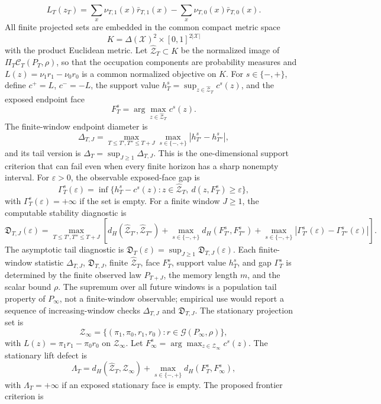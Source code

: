 \documentclass[11pt]{article}
\theoremstyle{definition}
\theoremstyle{plain}
\theoremstyle{remark}
\begin{document}
\[
L_T(z_T)=\sum_x\nu_{T,1}(x)\bar r_{T,1}(x)-\sum_x\nu_{T,0}(x)\bar r_{T,0}(x).
\]
All finite projected sets are embedded in the common compact metric space
\[
K=\Delta(\mathcal X)^2\times[0,1]^{2|\mathcal X|}
\]
with the product Euclidean metric.  Let \(\widehat{\mathcal Z}_T\subset K\) be the normalized image of \(\Pi_T\mathcal C_T(P_T,\rho)\), so that the occupation components are probability measures and \(L(z)=\nu_1r_1-\nu_0r_0\) is a common normalized objective on \(K\).  For \(s\in\{-,+\}\), define \(c^+=L\), \(c^-=-L\), the support value \(h_T^s=\sup_{z\in\widehat{\mathcal Z}_T}c^s(z)\), and the exposed endpoint face
\[
F_T^s=\arg\max_{z\in\widehat{\mathcal Z}_T}c^s(z).
\]
The finite-window endpoint diameter is
\[
\Delta_{T,J}
=\max_{T\le T',T''\le T+J}
\max_{s\in\{-,+\}}\left|h_{T'}^s-h_{T''}^s\right|,
\]
and its tail version is \(\Delta_T=\sup_{J\ge1}\Delta_{T,J}\).  This is the one-dimensional support criterion that can fail even when every finite horizon has a sharp nonempty interval.
For \(\varepsilon>0\), the observable exposed-face gap is
\[
\Gamma_T^s(\varepsilon)=
\inf\{h_T^s-c^s(z):z\in\widehat{\mathcal Z}_T,\ d(z,F_T^s)\ge\varepsilon\},
\]
with \(\Gamma_T^s(\varepsilon)=+\infty\) if the set is empty.  For a finite window \(J\ge1\), the computable stability diagnostic is
\[
\mathfrak D_{T,J}(\varepsilon)
=\max_{T\le T',T''\le T+J}
\left[
d_H(\widehat{\mathcal Z}_{T'},\widehat{\mathcal Z}_{T''})
+\max_{s\in\{-,+\}}d_H(F_{T'}^s,F_{T''}^s)
+\max_{s\in\{-,+\}}\left|\Gamma_{T'}^s(\varepsilon)-\Gamma_{T''}^s(\varepsilon)\right|
\right].
\]
The asymptotic tail diagnostic is \(\mathfrak D_T(\varepsilon)=\sup_{J\ge1}\mathfrak D_{T,J}(\varepsilon)\).  Each finite-window statistic \(\Delta_{T,J}\), \(\mathfrak D_{T,J}\), finite \(\widehat{\mathcal Z}_T\), face \(F_T^s\), support value \(h_T^s\), and gap \(\Gamma_T^s\) is determined by the finite observed law \(P_{T+J}\), the memory length \(m\), and the scalar bound \(\rho\).  The supremum over all future windows is a population tail property of \(P_{\infty}\), not a finite-window observable; empirical use would report a sequence of increasing-window checks \(\Delta_{T,J}\) and \(\mathfrak D_{T,J}\).
The stationary projection set is
\[
\mathcal Z_{\infty}
=\{(\pi_1,\pi_0,r_1,r_0):r\in\mathcal G(P_{\infty},\rho)\},
\]
with \(L(z)=\pi_1r_1-\pi_0r_0\) on \(\mathcal Z_\infty\).  Let \(F_\infty^s=\arg\max_{z\in\mathcal Z_\infty}c^s(z)\).  The stationary lift defect is
\[
\Lambda_T
=d_H(\widehat{\mathcal Z}_T,\mathcal Z_{\infty})
  +\max_{s\in\{-,+\}}d_H(F_T^s,F_\infty^s),
\]
with \(\Lambda_T=+\infty\) if an exposed stationary face is empty.  The proposed frontier criterion is
\end{document}
